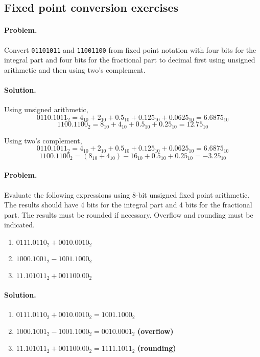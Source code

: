 \documentclass[12pt, oneside]{book}
\begin{document}
\subsection{Fixed point conversion exercises}
\paragraph{Problem.}
Convert \texttt{01101011} and \texttt{11001100} from fixed
point notation with four bits for the integral part and four bits for the
fractional part to decimal first using unsigned arithmetic and then using two's
complement.
\paragraph{Solution.}
Using unsigned arithmetic,
\[0110.1011_{2} = 4_{10} + 2_{10} + 0.5_{10} + 0.125_{10} + 0.0625_{10}
  = 6.6875_{10}\]
\[1100.1100_{2} = 8_{10} + 4_{10} + 0.5_{10} + 0.25_{10} = 12.75_{10}\]

Using two's complement,
\[0110.1011_{2} = 4_{10} + 2_{10} + 0.5_{10} + 0.125_{10} + 0.0625_{10}
 = 6.6875_{10}\]
\[1100.1100_{2} = \left( 8_{10} + 4_{10} \right) - 16_{10} + 0.5_{10}
 + 0.25_{10} = -3.25_{10}\]

\paragraph{Problem.}
Evaluate the following expressions using 8-bit unsigned
fixed point arithmetic. The results should have 4 bits for the integral part and
4 bits for the fractional part. The results must be rounded if necessary.
Overflow and rounding must be indicated.

\begin{enumerate}
    \item \(0111.0110_{2} + 0010.0010_{2}\)
    \item \(1000.1001_{2} - 1001.1000_{2}\)
    \item \(11.101011_{2} + 001100.00_{2}\)
\end{enumerate}

\paragraph{Solution.}
\begin{enumerate}
    \item \(0111.0110_{2} + 0010.0010_{2} = 1001.1000_{2}\)
    \item \(1000.1001_{2} - 1001.1000_{2} = 0010.0001_{2}\) \textbf{(overflow)}
    \item \(11.101011_{2} + 001100.00_{2} = 1111.1011_{2}\) \textbf{(rounding)}
\end{enumerate}
\end{document}
